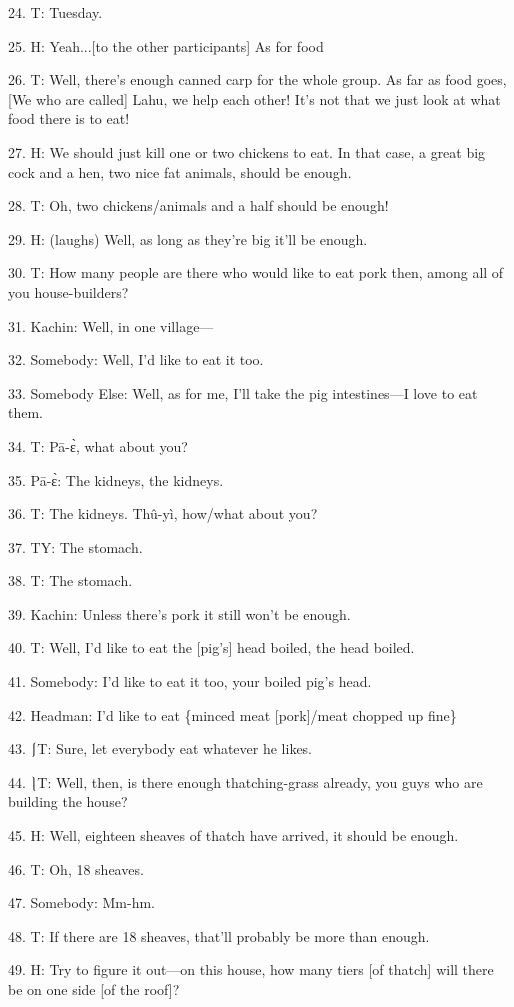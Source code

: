 24. T: Tuesday.

25. H: Yeah...[to the other participants] As for food

26. T: Well, there's enough canned carp for the whole group.  As far as food goes,
[We who are called] Lahu, we help each other!  It's not that we just look at what
food there is to eat!

27. H: We should just kill one or two chickens to eat.  In that case, a great big
cock and a hen, two nice fat animals, should be enough.

28. T: Oh, two chickens/animals and a half should be enough!

29. H: (laughs) Well, as long as they're big it'll be enough.

30. T: How many people are there who would like to eat pork then, among all of
you house-builders?

31. Kachin: Well, in one village---

32. Somebody: Well, I'd like to eat it too.

33. Somebody Else: Well, as for me, I'll take the pig intestines---I love to eat
them.

34. T: Pā-ɛ̀, what about you?

35. Pā-ɛ̀: The kidneys, the kidneys.

36. T: The kidneys. Thû-yì, how/what about you?

37. TY: The stomach.

38. T: The stomach.

39. Kachin: Unless there's pork it still won't be enough.

40. T: Well, I'd like to eat the [pig's] head boiled, the head boiled.

41. Somebody: I'd like to eat it too, your boiled pig's head.

42. Headman: I'd like to eat \{minced meat [pork]/meat chopped up fine\}

43. ⎰T: Sure, let everybody eat whatever he likes.

44. ⎱T: Well, then, is there enough thatching-grass already, you guys who are
building the house?

45. H: Well, eighteen sheaves of thatch have arrived, it should be enough.

46. T: Oh, 18 sheaves.

47. Somebody: Mm-hm.

48. T: If there are 18 sheaves, that'll probably be more than enough.

49. H: Try to figure it out---on this house, how many tiers [of thatch] will there
be on one side [of the roof]?

